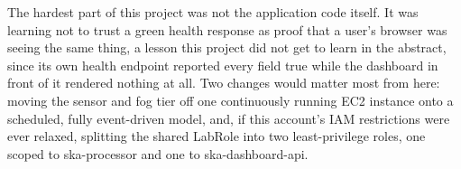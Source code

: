 \documentclass[conference]{IEEEtran}
\begin{document}
The hardest part of this project was not the application code itself. It was learning not to trust a green health response as proof that a user's browser was seeing the same thing, a lesson this project did not get to learn in the abstract, since its own health endpoint reported every field true while the dashboard in front of it rendered nothing at all. Two changes would matter most from here: moving the sensor and fog tier off one continuously running EC2 instance onto a scheduled, fully event-driven model, and, if this account's IAM restrictions were ever relaxed, splitting the shared LabRole into two least-privilege roles, one scoped to ska-processor and one to ska-dashboard-api.



\end{document}
